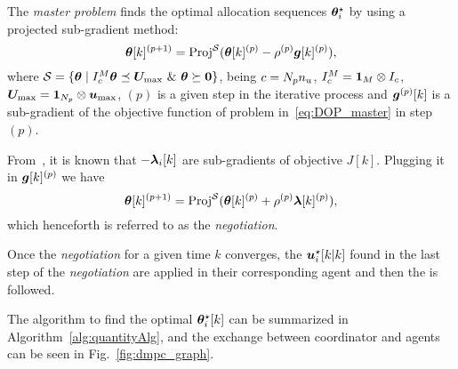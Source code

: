 \documentclass{ifacconf}  %
\begin{document}
The \emph{master problem} finds the optimal allocation sequences $\boldsymbol{\theta}_i^{\star}$ by using a projected sub-gradient method:
\begin{equation}
  \label{eq:projectedSubgradient}
\boldsymbol{\theta}[k]^{(p+1)}=\operatorname{Proj}^{\mathcal{S}}(\boldsymbol{\theta}[k]^{(p)}-\rho^{(p)}\boldsymbol{g}[k]^{(p)}),
\end{equation}
where ${\set{S} = \setbuild{\vec{\theta}}{I_{c}^{M}\vec{\theta}\preceq \vec{U}_{\max}\ \&\ \vec{\theta}\succeq\0 }}$, being ${c=N_{p} n_{u}}$, ${I_{c}^{M}=\mathbf{1}_{M}\mathbin{\otimes}I_{c}}$, ${\boldsymbol{U}_{\max}=\mathbf{1}_{N_{p}}\mathbin{\otimes}\boldsymbol{u}_{\max}}$, $(p)$ is a given step in the iterative process and $\boldsymbol{g}^{(p)}[k]$ is a sub-gradient of the objective function of problem in~\eqref{eq:DOP_master} in step $(p)$.

From~\cite{BoydEtAl2015}, it is known that $-\lambdaik$ are sub-gradients of objective $J[k]$.
Plugging it in $\boldsymbol{g}[k]^{(p)}$ we have
\begin{equation}
  \label{eq:thetaNegot}
\boldsymbol{\theta}[k]^{(p+1)}=\operatorname{Proj}^{\mathcal{S}}(\boldsymbol{\theta}[k]^{(p)}+\rho^{(p)}\boldsymbol{\lambda}[k]^{(p)}),
\end{equation}
\newcommand{\negotiation}{\emph{negotiation}}
which henceforth is referred to as the \negotiation.

Once the \negotiation{} for a given time $k$ converges, the $\optuikk$ found in the last step of the \negotiation{} are applied in their corresponding agent and then the \rhs{} is followed.

The algorithm to find the optimal $\boldsymbol{\theta}_i^{\star}[k]$ can be summarized in Algorithm~\ref{alg:quantityAlg}, and the exchange between coordinator and agents can be seen in Fig.~\ref{fig:dmpc_graph}.
\end{document}
